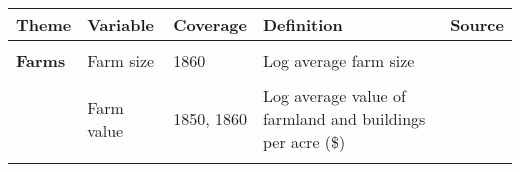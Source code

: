 \begin{tabular}{@{}l|llll@{}}
\hline\hline
\textbf{Theme}                     & \textbf{Variable}                                           & \textbf{Coverage}                     & \textbf{Definition}     & \textbf{Source}                            											     \\
\hline
                                   &                                                             &                                    &             &                                                                                                                                                                                                   \\                                                            
\textbf{Farms} 	      & Farm size          & 1860                       & Log average farm size           & \citet{haines2010}                                                                                                                                                    \\                               
                                     &                                                             &                            &               &            \\     
		&  Farm value                                               &  1850, 1860                          & Log average value of farmland and buildings per acre (\$)          & \citet{haines2010}             \\    
                                   &                                                             &                                 &             &                                                                                                                                                                                                   \\                                           

\end{tabular}
